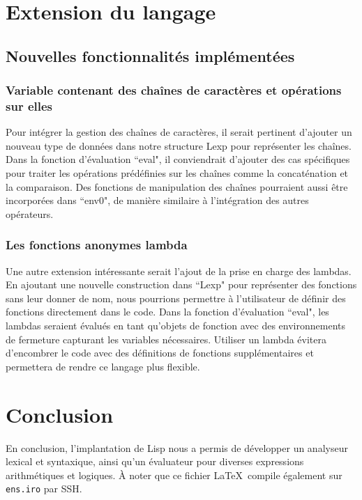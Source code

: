 \documentclass{article}
\begin{document}
\section{Extension du langage}
\subsection{Nouvelles fonctionnalités implémentées}
\subsubsection*{Variable contenant des chaînes de caractères et opérations sur elles}
Pour intégrer la gestion des chaînes de caractères, il serait pertinent d'ajouter un nouveau type de données dans notre structure Lexp pour représenter les chaînes. Dans la fonction d'évaluation ``eval", il conviendrait d'ajouter des cas spécifiques pour traiter les opérations prédéfinies sur les chaînes comme la concaténation et la comparaison. Des fonctions de manipulation des chaînes pourraient aussi être incorporées dans ``env0", de manière similaire à l'intégration des autres opérateurs.

\subsubsection*{Les fonctions anonymes lambda}
Une autre extension intéressante serait l'ajout de la prise en charge des lambdas. En ajoutant une nouvelle construction dans ``Lexp" pour représenter des fonctions sans leur donner de nom, nous pourrions permettre à l'utilisateur de définir des fonctions directement dans le code. Dans la fonction d'évaluation ``eval", les lambdas seraient évalués en tant qu'objets de fonction 
avec des environnements de fermeture capturant les variables nécessaires. Utiliser un lambda évitera d'encombrer le code avec 
des définitions de fonctions supplémentaires et permettera de rendre ce langage plus flexible.

\section{Conclusion}
En conclusion, l'implantation de Lisp nous a permis de développer un analyseur lexical et syntaxique, ainsi 
qu'un évaluateur pour diverses expressions arithmétiques et logiques. À noter que ce fichier \LaTeX\ compile également sur \texttt{ens.iro} par SSH.
\end{document}
